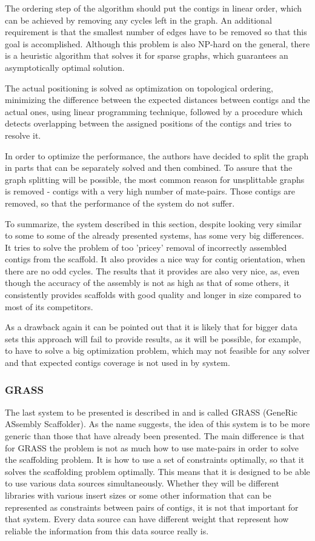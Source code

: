 \documentclass[11pt]{article}
\begin{document}
The ordering step of the algorithm should put the contigs in linear order, which
can be achieved by removing any cycles left in the graph. An additional
requirement is that the smallest number of edges have to be removed so that this
goal is accomplished. Although this problem is also NP-hard on the general,
there is a heuristic algorithm that solves it for sparse graphs, which
guarantees an asymptotically optimal solution. 

The actual positioning is solved as optimization on topological ordering,
minimizing the difference between the expected distances between contigs and the
actual ones, using linear programming technique, followed by a procedure which
detects overlapping between the assigned positions of the contigs and tries to
resolve it.

In order to optimize the performance, the authors have decided to split the
graph in parts that can be separately solved and then combined. To assure that
the graph splitting will be possible, the most common reason for unsplittable
graphs is removed - contigs with a very high number of mate-pairs. Those contigs
are removed, so that the performance of the system do not suffer.

To summarize, the system described in this section, despite looking very similar
to some to some of the already presented systems, has some very big differences.
It tries to solve the problem of too 'pricey' removal of incorrectly assembled
contigs from the scaffold. It also provides a nice way for contig orientation,
when there are no odd cycles. The results that it provides are also very nice,
as, even though the accuracy of the assembly is not as high as that of some
others, it consistently provides scaffolds with good quality and longer in size
compared to most of its competitors.

As a drawback again it can be pointed out that it is likely that for bigger data
sets this approach will fail to provide results, as it will be possible, for
example, to have to solve a big optimization problem, which may not feasible for
any solver and that expected contigs coverage is not used in by system. 

\subsubsection{GRASS} %
\label{ssub:GRASS}
The last system to be presented is described in \cite{grass} and is called
GRASS (GeneRic ASsembly Scaffolder). As the name suggests, the idea of this
system is to be more generic than those that have already been presented. The
main difference is that for GRASS the problem is not as much how to use
mate-pairs in order to solve the scaffolding problem. It is how to use a set of
constraints optimally, so that it solves the scaffolding problem optimally. This
means that it is designed to be able to use various data sources simultaneously.
Whether they will be different libraries with various insert sizes or some other
information that can be represented as constraints between pairs of contigs, it
is not that important for that system. Every data source can have different
weight that represent how reliable the information from this data source really
is.
\end{document}
